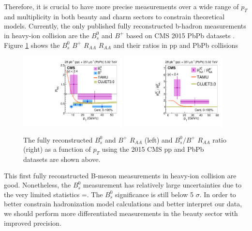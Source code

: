 
\clearpage

Therefore, it is crucial to have more precise measurements over a wide range of $p_T$ and multiplicity in both beauty and charm sectors to constrain theoretical models. Currently, the only published fully reconstructed b-hadron measurements in heavy-ion collision are the $B^0_s$ and $B^+$ based on CMS 2015 PbPb datasets \cite{CMSBsBP2015}. Figure \ref{BsBP2015} shows the $B^0_s$ $B^+$ $R_{AA}$ $R_{AA}$ and their ratios in pp and PbPb collisions

\begin{figure}[hbtp]
\begin{center}
\includegraphics[width=0.48\textwidth]{Figures/Chapter2/CMSBsBPRAA2015.pdf}
\includegraphics[width=0.48\textwidth]{Figures/Chapter2/CMSBsBP2015.pdf}
\caption{The fully reconstructed $B^0_s$ and $B^+$ $R_{AA}$ (left) and $B^0_s/B^+$ $R_{AA}$ ratio (right) as a function of $p_T$ using the 2015 CMS pp and PbPb datasets are shown above.}
\label{BsBP2015}
\end{center}
\end{figure}   


This first fully reconstructed B-meson measurements in heavy-ion collision are good. Nonetheless, the $B^0_s$ measurement has relatively large uncertainties due to the very limited statistics =. The $B^0_s$ significance is still below 5 $\sigma$. In order to better constrain hadronization model calculations and better interpret our data, we should perform more differentiated measurements in the beauty sector with improved precision. 

